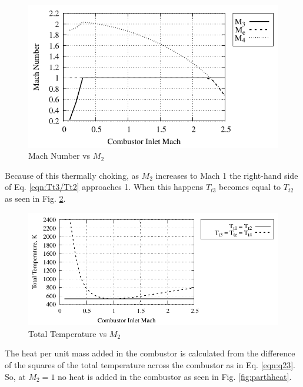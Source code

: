 \documentclass[conf]{new-aiaa} %
\begin{document}
\begin{figure}[H] %
    \centering
    \includegraphics[]{media/performance_parameter_files/part_h_mach.pdf}
    \caption{\label{fig:parthmach}Mach Number vs \texorpdfstring{\textit{$M_2$}}{M2}}
\end{figure}
Because of this thermally choking, as $M_2$ increases to Mach 1 the right-hand side of Eq. \ref{eqn:Tt3/Tt2} approaches 1. When this happens $T_{t3}$ becomes equal to $T_{t2}$ as seen in Fig. \ref{fig:parthtottemp}.

\begin{figure}[H] %
    \centering
    \includegraphics[]{media/performance_parameter_files/part_h_total_temp.pdf}
    \caption{\label{fig:parthtottemp}Total Temperature vs \texorpdfstring{\textit{$M_2$}}{M2}}
\end{figure}
The heat per unit mass added in the combustor is calculated from the difference of the squares of the total temperature across the combustor as in Eq. \ref{eqn:q23}. So, at $M_2=1$ no heat is added in the combustor as seen in Fig. \ref{fig:parthheat}.
\end{document}
